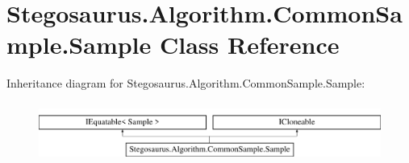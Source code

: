 \hypertarget{class_stegosaurus_1_1_algorithm_1_1_common_sample_1_1_sample}{}\section{Stegosaurus.\+Algorithm.\+Common\+Sample.\+Sample Class Reference}
\label{class_stegosaurus_1_1_algorithm_1_1_common_sample_1_1_sample}
Inheritance diagram for Stegosaurus.\+Algorithm.\+Common\+Sample.\+Sample\+:\begin{figure}[H]
\begin{center}
\leavevmode
\includegraphics[height=1.964912cm]{class_stegosaurus_1_1_algorithm_1_1_common_sample_1_1_sample}
\end{center}
\end{figure}
